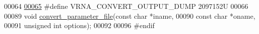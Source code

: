 \begin{DoxyCode}
00064 
\hypertarget{convert__epars_8h_source.tex_l00065}{}\hyperlink{group__energy__parameters__convert_gac86976e9c2a55b3a6481ea60044f6098}{00065} \textcolor{preprocessor}{#define VRNA\_CONVERT\_OUTPUT\_DUMP          2097152U}
00066 
00089 \textcolor{keywordtype}{void} \hyperlink{group__energy__parameters__convert_gafbe538bc4eb2cf2a33326e1010005f8a}{convert\_parameter\_file}(\textcolor{keyword}{const} \textcolor{keywordtype}{char} *iname,
00090                             \textcolor{keyword}{const} \textcolor{keywordtype}{char} *oname,
00091                             \textcolor{keywordtype}{unsigned} \textcolor{keywordtype}{int} options);
00092 
00096 \textcolor{preprocessor}{#endif}
\end{DoxyCode}
